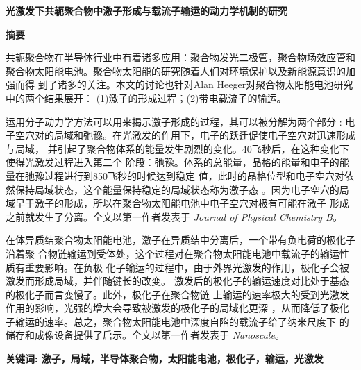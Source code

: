 \documentclass[12pt,]{report}
\date{}
\begin{document}
 \vspace*{0.0cm}

\begin{center}
\Large \textbf{光激发下共轭聚合物中激子形成与载流子输运的动力学机制的研究}
\end{center}\vspace{0.54cm}\begin{center}
\Large \textbf{摘要}
\end{center}

\pagestyle{plain}

\vspace{1.5cm}


共轭聚合物在半导体行业中有着诸多应用：聚合物发光二极管，聚合物场效应管和
聚合物太阳能电池。聚合物太阳能的研究随着人们对环境保护以及新能源意识的加强而得
到了诸多的关注。本文的讨论也针对Alan
Heeger对聚合物太阳能电池研究中的两个结果展开：
(1)激子的形成过程；(2)带电载流子的输运。

运用分子动力学方法可以用来揭示激子形成的过程，其可以被分解为两个部分 :
电子空穴对的局域和弛豫。在光激发的作用下，电子的跃迁促使电子空穴对迅速形成与局域，
并引起了聚合物体系的能量发生剧烈的变化。40飞秒后，在这种变化下使得光激发过程进入第二个
阶段：弛豫。体系的总能量，晶格的能量和电子的能量在弛豫过程进行到850飞秒的时候达到稳定
值，此时的晶格位型和电子空穴对依然保持局域状态，这个能量保持稳定的局域状态称为激子态
。因为电子空穴的局域早于激子的形成，所以在聚合物太阳能电池中电子空穴对极有可能在激子
形成之前就发生了分离。全文以第一作者发表于 \emph{Journal of Physical
Chemistry B}。

在体异质结聚合物太阳能电池，激子在异质结中分离后，一个带有负电荷的极化子沿着聚
合物链输运到受体处，这个过程对在聚合物太阳能电池中载流子的输运性质有重要影响。在负极
化子输运的过程中，由于外界光激发的作用，极化子会被激发而形成局域，并伴随键长的改变。
激发后的极化子的输运速度对比处于基态的极化子而言变慢了。此外，极化子在聚合物链
上输运的速率极大的受到光激发作用的影响，光强的增大会导致被激发的极化子的局域化更深
，从而降低了极化子输运的速率。总之，聚合物太阳能电池中深度自陷的载流子给了纳米尺度下
的储存和成像设备提供了启示。全文以第一作者发表于 \emph{Nanoscale}。

\vspace{1.5cm}

\noindent
\large 
\textbf{关键词: 激子，局域，半导体聚合物，太阳能电池，极化子，输运，光激发}

\clearpage
\end{document}
